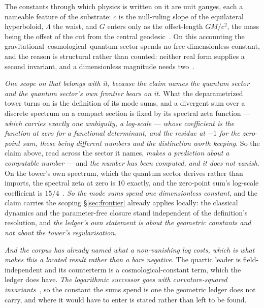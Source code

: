 \documentclass[11pt,a4paper]{article}
\theoremstyle{plain}
\theoremstyle{definition}
\begin{document}
The constants through which physics is written on it are unit gauges, each a nameable feature of the
substrate: $c$ is the null-ruling slope of the equilateral hyperboloid, $\Lambda$ the waist, and $G$ enters
only as the offset-length $GM/c^{2}$, the mass being the offset of the cut from the central
geodesic~\cite{JanzenGeometricCore,JanzenOperator,JanzenSlicing}. On this accounting the
gravitational--cosmological--quantum sector spends no free dimensionless constant, and the reason is
structural rather than counted: neither real form supplies a second invariant, and a dimensionless magnitude
needs two~\cite{JanzenGeometricCore}.

\emph{One scope on that belongs with it, because the claim names the quantum sector and the quantum sector's
own frontier bears on it.} What the deparametrized tower turns on is the definition of its mode sums, and
a divergent sum over a discrete spectrum on a compact section is fixed by its spectral zeta function ---
\emph{which carries exactly one ambiguity, a log-scale} --- \emph{whose coefficient is the function at zero for a functional determinant, and the residue at $-1$ for the zero-point sum, these being different numbers and the distinction worth keeping}. So the
claim above, read across the sector it names, \emph{makes a prediction about a computable number} --- and
\emph{the number has been computed, and it does not vanish}. On the tower's own spectrum, which the quantum
sector derives rather than imports, the spectral zeta at zero is $10$ exactly, and the zero-point sum's
log-scale coefficient is $15/4$~\cite{JanzenCanonicalTime}. \emph{So the mode sums spend one dimensionless
constant}, and the claim carries the scoping \S\ref{sec:frontier} already applies locally: the classical
dynamics and the parameter-free closure stand independent of the definition's resolution, and \emph{the
ledger's own statement is about the geometric constants and not about the tower's regularisation}.

\emph{And the corpus has already named what a non-vanishing log costs, which is what makes this a located
result rather than a bare negative.} The quartic leader is field-independent and its counterterm is a
cosmological-constant term, which the ledger does have. \emph{The logarithmic successor goes with
curvature-squared invariants}~\cite{JanzenCanonicalTime}, so the constant the sums spend is one the geometric
ledger does not carry, and where it would have to enter is stated rather than left to be found.
\end{document}
